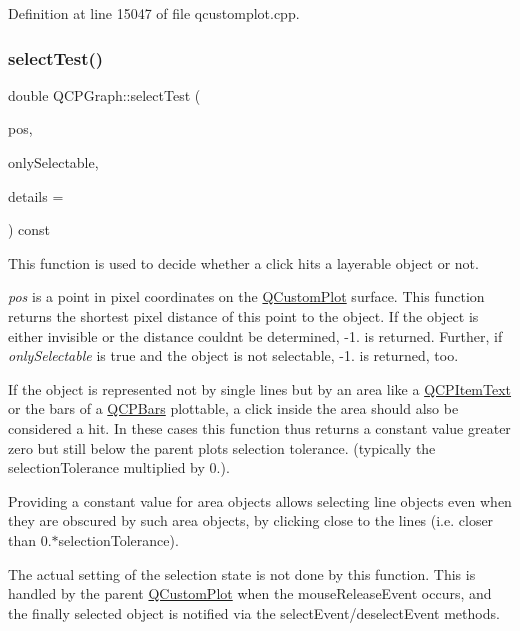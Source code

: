 Definition at line 15047 of file qcustomplot.\+cpp.

\mbox{\label{class_q_c_p_graph_a36011c34aca4f7a477de25961e2f6c13}} 
\subsubsection{\texorpdfstring{select\+Test()}{selectTest()}}
{\footnotesize\ttfamily double Q\+C\+P\+Graph\+::select\+Test (\begin{DoxyParamCaption}\item[{const Q\+PointF \&}]{pos,  }\item[{bool}]{only\+Selectable,  }\item[{Q\+Variant $\ast$}]{details = {} }\end{DoxyParamCaption}) const\hspace{0.3cm}{\ttfamily [virtual]}}

This function is used to decide whether a click hits a layerable object or not.

{\itshape pos} is a point in pixel coordinates on the \hyperlink{class_q_custom_plot}{Q\+Custom\+Plot} surface. This function returns the shortest pixel distance of this point to the object. If the object is either invisible or the distance couldn\textquotesingle{}t be determined, -\/1. is returned. Further, if {\itshape only\+Selectable} is true and the object is not selectable, -\/1. is returned, too.

If the object is represented not by single lines but by an area like a \hyperlink{class_q_c_p_item_text}{Q\+C\+P\+Item\+Text} or the bars of a \hyperlink{class_q_c_p_bars}{Q\+C\+P\+Bars} plottable, a click inside the area should also be considered a hit. In these cases this function thus returns a constant value greater zero but still below the parent plot\textquotesingle{}s selection tolerance. (typically the selection\+Tolerance multiplied by 0.).

Providing a constant value for area objects allows selecting line objects even when they are obscured by such area objects, by clicking close to the lines (i.\+e. closer than 0.$\ast$selection\+Tolerance).

The actual setting of the selection state is not done by this function. This is handled by the parent \hyperlink{class_q_custom_plot}{Q\+Custom\+Plot} when the mouse\+Release\+Event occurs, and the finally selected object is notified via the select\+Event/deselect\+Event methods.

